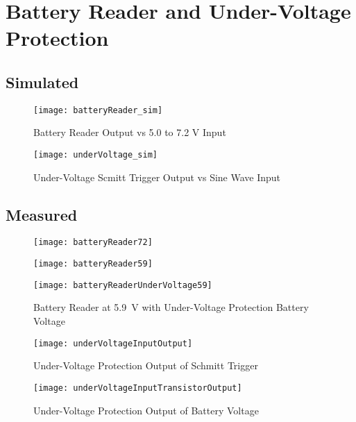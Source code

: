\graphicspath{{content/3_results/figures}}
\section{Battery Reader and Under-Voltage Protection}

\subsection{Simulated}

\begin{figure}[!htb]
  \centering
  \texttt{[image: batteryReader\_sim]}
  \caption{Battery Reader Output vs 5.0 to 7.2 V Input}
  \label{fig:batteryReader_sim}
\end{figure}

\begin{figure}[!htb]
  \centering
  \texttt{[image: underVoltage\_sim]}
  \caption{Under-Voltage Scmitt Trigger Output vs Sine Wave Input}
  \label{fig:underVoltage_sim}
\end{figure}

\pagebreak
\subsection{Measured}

\begin{figure}[!htb]
    \centering
    \begin{minipage}{.45\textwidth}
        \centering
        \texttt{[image: batteryReader72]}
        \label{fig:batteryReader72}
    \end{minipage}
    \begin{minipage}{.45\textwidth}
        \centering
        \texttt{[image: batteryReader59]}
        \label{fig:batteryReader59}
    \end{minipage}
\end{figure}

\begin{figure}[!htb]
  \centering
  \texttt{[image: batteryReaderUnderVoltage59]}
  \caption{Battery Reader at \SI{5.9}{V} with Under-Voltage Protection Battery Voltage}
  \label{fig:batteryReaderUnderVoltage59}
\end{figure}

\begin{figure}[!htb]
  \centering
  \texttt{[image: underVoltageInputOutput]}
  \caption{Under-Voltage Protection Output of Schmitt Trigger}
  \label{fig:underVoltageInputOutput}
\end{figure}

\begin{figure}[!htb]
  \centering
  \texttt{[image: underVoltageInputTransistorOutput]}
  \caption{Under-Voltage Protection Output of Battery Voltage}
  \label{fig:underVoltageInputTransistorOutput}
\end{figure}